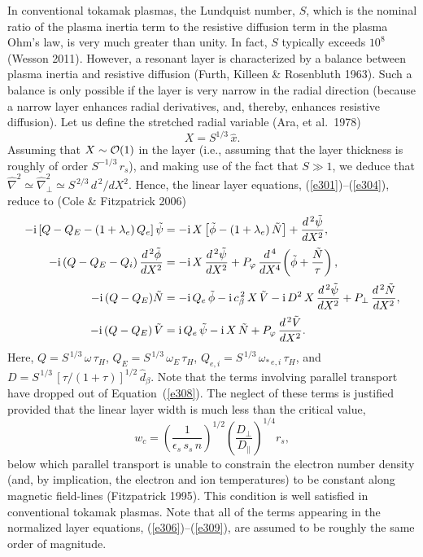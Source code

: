 \documentclass[notitlepage,12pt]{article}
\begin{document}
In conventional tokamak plasmas, the Lundquist number, $S$, which is the nominal ratio of the plasma inertia term to the   resistive diffusion  term in the plasma Ohm's law, is very much greater than unity. In fact, $S$ typically exceeds $10^8$ (Wesson 2011). However, a resonant layer is
characterized by a balance between plasma inertia and resistive diffusion (Furth, Killeen \& Rosenbluth 1963). Such a balance is
only possible if the layer is very narrow in the radial direction (because a narrow layer enhances radial derivatives, and, thereby, enhances
resistive diffusion). Let us define the stretched radial variable (Ara, et al.\ 1978)
\begin{equation}
X = S^{1/3}\,\hat{x}.
\end{equation}
Assuming that $X\sim{\cal O}(1)$ in the layer (i.e., assuming that the layer thickness is roughly of order $S^{-1/3}\,r_s$),
and making use of the fact that $S\gg 1$, we deduce that $\hat{\nabla}^2\simeq \hat{\nabla}_\perp^2\simeq S^{\,2/3}\,d^{\,2}/dX^2$.
Hence, the linear layer equations, (\ref{e301})--(\ref{e304}), reduce to (Cole \& Fitzpatrick 2006)
\begin{align}\label{e306}
-{\rm i}\,[Q-Q_E-(1+\lambda_e)\,Q_{e}]\,\tilde{\psi}&= - {\rm i}\,X\left[\tilde{\phi}-(1+\lambda_e)\,\tilde{N}\right] + \frac{d^{\,2}\tilde{\psi}}{d X^2},\\[0.5ex]
-{\rm i}\,(Q-Q_E -Q_{i})\,\frac{d^{\,2}\tilde{\phi}}{dX^2}&= - {\rm i}\,X\,\frac{d^{\,2}\tilde{\psi}}{dX^2}+ P_\varphi\,\frac{d^{\,4}}{dX^4}\!\left(\tilde{\phi} + \frac{\tilde{N}}{\tau}\right),\\[0.5ex]
-{\rm i}\,(Q-Q_E)\tilde{N} &= - {\rm i}\,Q_{e}\,\tilde{\phi} - {\rm i}\,c_\beta^{\,2}\,X\,\tilde{V}  - {\rm i} \,D^{2}\,X\,\frac{d^{\,2}\tilde{\psi}}{dX^{2}}
+ P_\perp\,\frac{d^{\,2} \tilde{N}}{dX^{2}},\label{e308}\\[0.5ex]
 -{\rm i}\,(Q-Q_E)\,\tilde{V} &= {\rm i}\,Q_{e}\,\tilde{\psi} - {\rm i}\,X\,\tilde{N} + P_\varphi\,\frac{d^{\,2}\tilde{V}}{dX^{2}}.\label{e309}
\end{align}
Here, $Q=S^{\,1/3}\,\omega\,\tau_H$, $Q_E = S^{\,1/3}\,\omega_E\,\tau_H$, $Q_{e,i} = S^{\,1/3}\,\omega_{\ast\,e,i}\,\tau_H$,
and $D = S^{\,1/3}\,[\tau/(1+\tau)]^{1/2}\,\hat{d}_\beta$. Note that the terms involving parallel transport have dropped out of
Equation~(\ref{e308}). The neglect of these terms is justified provided that the linear layer width is much less than the critical value,
\begin{equation}\label{wcdef}
w_c = \left(\frac{1}{\epsilon_s\,s_s\,n}\right)^{1/2}\left(\frac{D_\perp}{D_\parallel}\right)^{1/4}r_s,
\end{equation}
below which parallel transport is unable to constrain the electron number density (and, by implication, the electron and
ion temperatures) to be constant along magnetic field-lines (Fitzpatrick 1995). This condition is well satisfied in conventional
tokamak plasmas. 
Note that all of the terms appearing in the 
normalized layer equations, (\ref{e306})--(\ref{e309}), are assumed to be roughly the same order of magnitude. 
\end{document}
